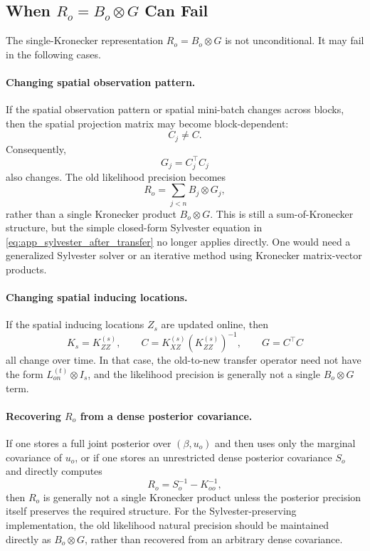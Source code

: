 \documentclass[12pt]{article}
\begin{document}
\subsection{\texorpdfstring{When \(R_o=B_o\otimes G\) Can Fail}{When Ro = Bo tensor G Can Fail}}
\label{app:failure_cases_Ro_kron}

The single-Kronecker representation \(R_o=B_o\otimes G\) is not
unconditional. It may fail in the following cases.

\paragraph{Changing spatial observation pattern.}
If the spatial observation pattern or spatial mini-batch changes across
blocks, then the spatial projection matrix may become block-dependent:
\begin{equation}
    C_j\neq C.
\end{equation}
Consequently,
\begin{equation}
    G_j=C_j^\top C_j
\end{equation}
also changes. The old likelihood precision becomes
\begin{equation}
    R_o
    =
    \sum_{j<n}
    B_j\otimes G_j,
\end{equation}
rather than a single Kronecker product \(B_o\otimes G\). This is still a
sum-of-Kronecker structure, but the simple closed-form Sylvester equation
in \eqref{eq:app_sylvester_after_transfer} no longer applies directly.
One would need a generalized Sylvester solver or an iterative method using
Kronecker matrix-vector products.

\paragraph{Changing spatial inducing locations.}
If the spatial inducing locations \(Z_s\) are updated online, then
\begin{equation}
    K_s=K_{ZZ}^{(s)},
    \qquad
    C=K_{XZ}^{(s)}\left(K_{ZZ}^{(s)}\right)^{-1},
    \qquad
    G=C^\top C
\end{equation}
all change over time. In that case, the old-to-new transfer operator need
not have the form \(L_{on}^{(t)}\otimes I_s\), and the likelihood
precision is generally not a single \(B_o\otimes G\) term.

\paragraph{Recovering \(R_o\) from a dense posterior covariance.}
If one stores a full joint posterior over \((\beta,u_o)\) and then uses
only the marginal covariance of \(u_o\), or if one stores an unrestricted
dense posterior covariance \(S_o\) and directly computes
\begin{equation}
    R_o=S_o^{-1}-K_{oo}^{-1},
\end{equation}
then \(R_o\) is generally not a single Kronecker product unless the
posterior precision itself preserves the required structure. For the
Sylvester-preserving implementation, the old likelihood natural precision
should be maintained directly as \(B_o\otimes G\), rather than recovered
from an arbitrary dense covariance.
\end{document}
